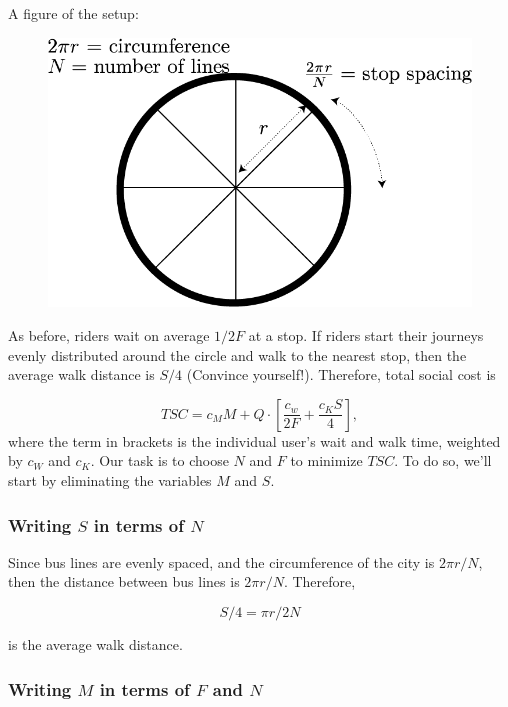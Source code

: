 \documentclass[11pt]{article}
\makeatletter
\def\maxwidth{\ifdim\Gin@nat@width>\linewidth\linewidth
    \else\Gin@nat@width\fi}
\let\Oldincludegraphics\includegraphics
\renewcommand{\includegraphics}[1]{\Oldincludegraphics[width=.8\maxwidth]{#1}}
\makeatother
\begin{document}
A figure of the setup:

\begin{figure}
\centering
\includegraphics{./walking-time-model.png}
\caption{}
\end{figure}

As before, riders wait on average \(1/2F\) at a stop. If riders start
their journeys evenly distributed around the circle and walk to the
nearest stop, then the average walk distance is \(S/4\) (Convince
yourself!). Therefore, total social cost is

\[
TSC = c_M M + Q\cdot \left[\frac{c_w}{2F} + \frac{c_KS}{4}\right],
\] where the term in brackets is the individual user's wait and walk
time, weighted by \(c_W\) and \(c_K\). Our task is to choose \(N\) and
\(F\) to minimize \(TSC\). To do so, we'll start by eliminating the
variables \(M\) and \(S\).

\subsubsection{\texorpdfstring{Writing \(S\) in terms of
\(N\)}{Writing S in terms of N}}\label{writing-s-in-terms-of-n}

Since bus lines are evenly spaced, and the circumference of the city is
\(2\pi r/N\), then the distance between bus lines is \(2\pi r / N\).
Therefore,

\[S/4=\pi r/2N\]

is the average walk distance.

\subsubsection{\texorpdfstring{Writing \(M\) in terms of \(F\) and
\(N\)}{Writing M in terms of F and N}}\label{writing-m-in-terms-of-f-and-n}
\end{document}
